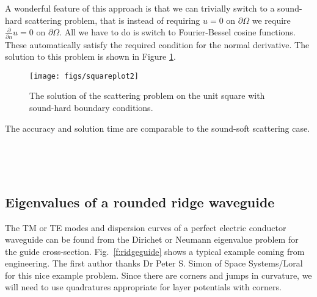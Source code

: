 A wonderful feature of this approach is that we can trivially switch
to a sound-hard scattering problem, that is instead of requiring $u=0$
on $\partial\Omega$ we require $\frac{\partial}{\partial n} u=0$ on
$\partial\Omega$. All we have to do is switch to Fourier-Bessel cosine
functions. These automatically satisfy the required condition for the
normal derivative. The solution to this problem is shown in Figure
\ref{fig:squareplot2}.
\begin{figure}
\center
\texttt{[image: figs/squareplot2]}
\caption{The solution of the scattering problem on the unit
  square with sound-hard boundary conditions.}
\label{fig:squareplot2}
\end{figure}
The accuracy and solution time are comparable to the sound-soft
scattering case.












\bfi %
\mbox{
\quad
{}
}
\efi

\bfi %
\mbox{
\quad
{}
}
\efi


\subsection{Eigenvalues of a rounded ridge waveguide}
\label{s:ridge}

The TM or TE modes and dispersion curves
of a perfect electric conductor waveguide can
be found from the Dirichet or Neumann eigenvalue problem for the
guide cross-section.
Fig.~\ref{f:ridgeguide} shows a typical example coming from engineering.
The first author thanks Dr Peter S. Simon of
Space Systems/Loral for this nice example problem.
Since there are corners and jumps in curvature, we will need to use
quadratures appropriate for layer potentials with corners.

